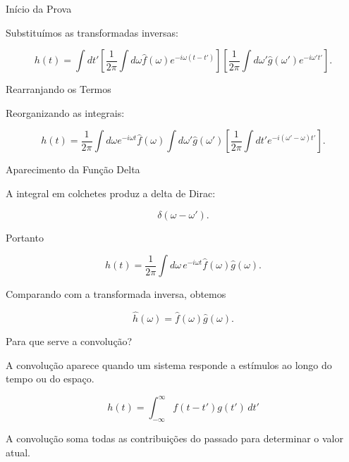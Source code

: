 \documentclass[aspectratio=169]{beamer}
\begin{document}
\begin{frame}{Início da Prova}

Substituímos as transformadas inversas:

\begin{equation}
h(t)=
\int dt'
\left[
\frac{1}{2\pi}
\int d\omega
\hat f(\omega)e^{-i\omega(t-t')}
\right]
\left[
\frac{1}{2\pi}
\int d\omega'
\hat g(\omega')e^{-i\omega' t'}
\right].
\tag{1.134}
\end{equation}

\end{frame}

\begin{frame}{Rearranjando os Termos}

Reorganizando as integrais:

\begin{equation}
h(t)=
\frac{1}{2\pi}
\int d\omega
e^{-i\omega t}
\hat f(\omega)
\int d\omega'
\hat g(\omega')
\left[
\frac{1}{2\pi}
\int dt'
e^{-i(\omega'-\omega)t'}
\right].
\tag{1.135}
\end{equation}

\end{frame}

\begin{frame}{Aparecimento da Função Delta}

A integral em colchetes produz a delta de Dirac:

\[
\delta(\omega-\omega').
\]

Portanto

\begin{equation}
h(t)=
\frac{1}{2\pi}
\int d\omega\,
e^{-i\omega t}
\hat f(\omega)\hat g(\omega).
\tag{1.136}
\end{equation}

Comparando com a transformada inversa, obtemos

\[
\hat h(\omega)=\hat f(\omega)\hat g(\omega).
\]

\end{frame}


\begin{frame}{Para que serve a convolução?}

A convolução aparece quando um sistema responde a estímulos
ao longo do tempo ou do espaço.

\begin{equation}
h(t)=\int_{-\infty}^{\infty} f(t-t')g(t')\,dt'
\end{equation}

\begin{tcolorbox}[colback=blue!5,colframe=blue]
A convolução soma todas as contribuições do passado
para determinar o valor atual.
\end{tcolorbox}

\end{frame}
\end{document}
